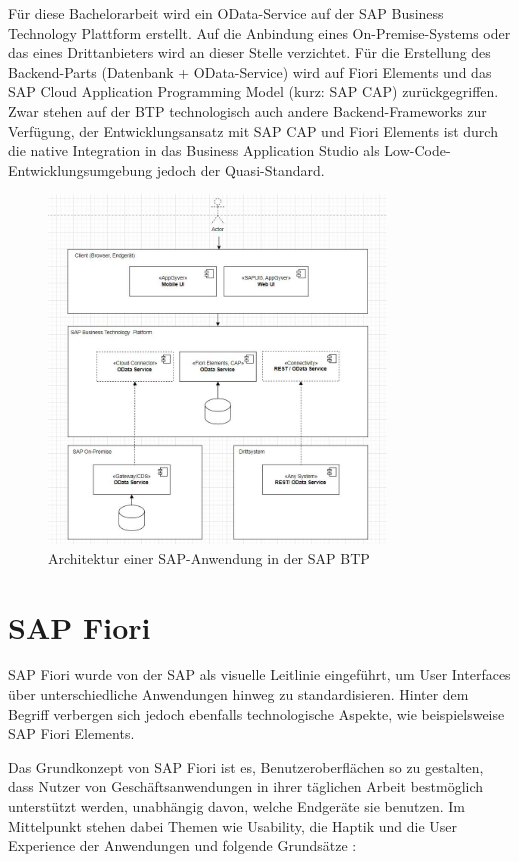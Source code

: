 Für diese Bachelorarbeit wird ein OData-Service auf der SAP Business Technology Plattform erstellt. Auf die Anbindung eines On-Premise-Systems oder das eines Drittanbieters wird an dieser Stelle verzichtet. Für die Erstellung des Backend-Parts (Datenbank + OData-Service) wird auf Fiori Elements und das SAP Cloud Application Programming Model (kurz: SAP CAP) zurückgegriffen. Zwar stehen auf der BTP technologisch auch andere Backend-Frameworks zur Verfügung, der Entwicklungsansatz mit SAP CAP und Fiori Elements ist durch die native Integration in das Business Application Studio als Low-Code-Entwicklungsumgebung jedoch der Quasi-Standard. 

\begin{figure}[htbp]
 \centering
 \includegraphics[width=0.8\textwidth]{Bilder/architecture/SAP_Anwendung_Architektur.jpg}
 \caption{Architektur einer SAP-Anwendung in der SAP BTP}
\end{figure}


\section{SAP Fiori}

SAP Fiori wurde von der SAP als visuelle Leitlinie eingeführt, um User Interfaces über unterschiedliche Anwendungen hinweg zu standardisieren. Hinter dem Begriff verbergen sich jedoch ebenfalls technologische Aspekte, wie beispielsweise SAP Fiori Elements.

Das Grundkonzept von SAP Fiori ist es, Benutzeroberflächen so zu gestalten, dass Nutzer von Geschäftsanwendungen in ihrer täglichen Arbeit bestmöglich unterstützt werden, unabhängig davon, welche Endgeräte sie benutzen. Im Mittelpunkt stehen dabei Themen wie Usability, die Haptik und die User Experience der Anwendungen und folgende Grundsätze \cite[S.31]{fiori}:

